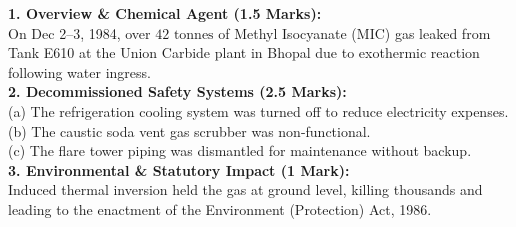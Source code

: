 \begin{solutionbox}
\textbf{1. Overview \& Chemical Agent (1.5 Marks):}\\
On Dec 2--3, 1984, over $42\text{ tonnes}$ of Methyl Isocyanate (MIC) gas leaked from Tank E610 at the Union Carbide plant in Bhopal due to exothermic reaction following water ingress.\\
\textbf{2. Decommissioned Safety Systems (2.5 Marks):}\\
(a) The refrigeration cooling system was turned off to reduce electricity expenses.\\
(b) The caustic soda vent gas scrubber was non-functional.\\
(c) The flare tower piping was dismantled for maintenance without backup.\\
\textbf{3. Environmental \& Statutory Impact (1 Mark):}\\
Induced thermal inversion held the gas at ground level, killing thousands and leading to the enactment of the Environment (Protection) Act, 1986.
\end{solutionbox}
\newpage
